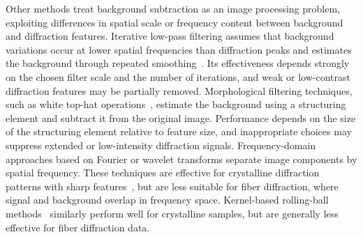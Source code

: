 \documentclass[11pt,onecolumn]{IEEEtran}
\begin{document}
Other methods treat background subtraction as an image processing problem, exploiting differences in spatial scale or frequency content between background and diffraction features. Iterative low-pass filtering assumes that background variations occur at lower spatial frequencies than diffraction peaks and estimates the background through repeated smoothing~\cite{IvanovaMakowski1998}. Its effectiveness depends strongly on the chosen filter scale and the number of iterations, and weak or low-contrast diffraction features may be partially removed. Morphological filtering techniques, such as white top-hat operations~\cite{GonzalezWoodsDIP4e}, estimate the background using a structuring element and subtract it from the original image. Performance depends on the size of the structuring element relative to feature size, and inappropriate choices may suppress extended or low-intensity diffraction signals. Frequency-domain approaches based on Fourier or wavelet transforms separate image components by spatial frequency. These techniques are effective for crystalline diffraction patterns with sharp features~\cite{PolarBackground2024, WaveletBiomedOptExpress2021, renedecotret2017baseline}, but are less suitable for fiber diffraction, where signal and background overlap in frequency space. Kernel-based rolling-ball methods~\cite{Sternberg1983} similarly perform well for crystalline samples, but are generally less effective for fiber diffraction data.
\end{document}
